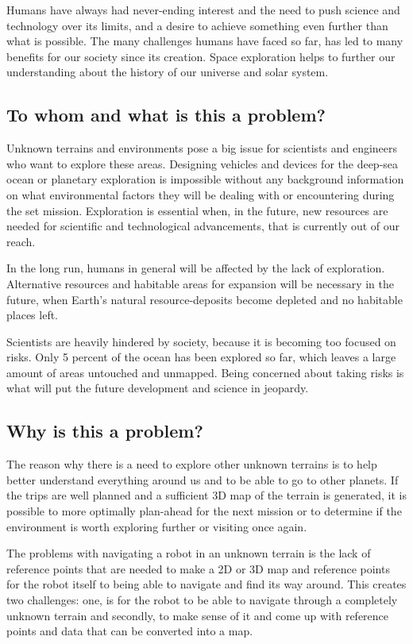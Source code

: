 Humans have always had never-ending interest and the need to push science and technology over its limits, and a desire to achieve something even further than what is possible. The many challenges humans have faced so far, has led to many benefits for our society since its creation. Space exploration helps to further our understanding about the history of our universe and solar system\cite{whyweexplo}.

\subsection{To whom and what is this a problem?}
Unknown terrains and environments pose a big issue for scientists and engineers who want to explore these areas. Designing vehicles and devices for the deep-sea ocean or planetary exploration is impossible without any background information on what environmental factors they will be dealing with or encountering during the set mission. Exploration is essential when, in the future, new resources are needed for scientific and technological advancements, that is currently out of our reach.

In the long run, humans in general will be affected by the lack of exploration. Alternative resources and habitable areas for expansion will be necessary in the future, when Earth's natural resource-deposits become depleted and no habitable places left. 

Scientists are heavily hindered by society, because it is becoming too focused on risks. Only 5 percent of the ocean has been explored so far, which leaves a large amount of areas untouched and unmapped. Being concerned about taking risks is what will put the future development and science in jeopardy\cite{risksandexplo}. 

\subsection{Why is this a problem?}
The reason why there is a need to explore other unknown terrains is to help better understand everything around us and to be able to go to other planets. 
If the trips are well planned and a sufficient 3D map of the terrain is generated, it is possible to more optimally plan-ahead for the next mission or to determine if the environment is worth exploring further or visiting once again. 

The problems with navigating a robot in an unknown terrain is the lack of reference points that are needed to make a 2D or 3D map and reference points for the robot itself to being able to navigate and find its way around. This creates two challenges: one, is for the robot to be able to navigate through a completely unknown terrain and secondly, to make sense of it and come up with reference points and data that can be converted into a map.

